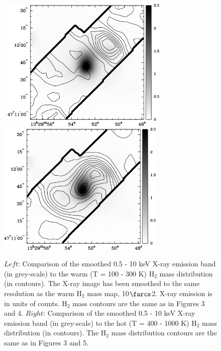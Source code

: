 \documentclass[manuscript]{aastex}
\begin{document}
\begin{figure}[!t]
\centerline{\hbox{ \hspace{0.0in} 
\includegraphics[width=8cm,angle=0]{x_v_cold.jpg}
\hspace{0.1in}
\includegraphics[width=8cm,angle=0]{x_v_warm.jpg}}}
\caption{$Left$:  Comparison of the smoothed 0.5 - 10 keV X-ray emission band (in grey-scale) to the warm (T = 100 - 300 K) $\mathrm{H_2}$ mass distribution (in contours).   The X-ray image has been smoothed to the same resolution as the warm $\mathrm{H_2}$ mass map, 10$\farcs$2.  X-ray emission is in units of counts.  $\mathrm{H_2}$ mass contours are the same as in Figures 3 and 4.  $Right$: Comparison of the smoothed 0.5 - 10 keV X-ray emission band (in grey-scale) to the hot (T = 400 - 1000 K) $\mathrm{H_2}$ mass distribution (in contours).  The $\mathrm{H_2}$ mass distribution contours are the same as in Figures 3 and 5.\label{fig10}}
\end{figure}

\clearpage
\end{document}
